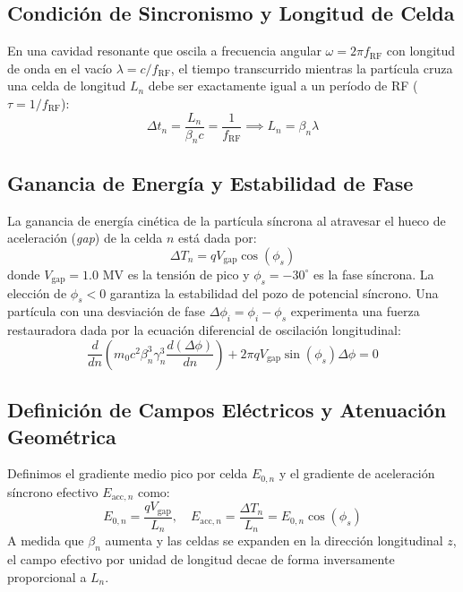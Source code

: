 \subsection{Condición de Sincronismo y Longitud de Celda}
En una cavidad resonante que oscila a frecuencia angular $\omega = 2\pi f_{\text{RF}}$ con longitud de onda en el vacío $\lambda = c / f_{\text{RF}}$, el tiempo transcurrido mientras la partícula cruza una celda de longitud $L_n$ debe ser exactamente igual a un período de RF ($\tau = 1/f_{\text{RF}}$):
\begin{equation}
\Delta t_n = \frac{L_n}{\beta_n c} = \frac{1}{f_{\text{RF}}} \implies L_n = \beta_n \lambda
\end{equation}

\subsection{Ganancia de Energía y Estabilidad de Fase}
La ganancia de energía cinética de la partícula síncrona al atravesar el hueco de aceleración (\textit{gap}) de la celda $n$ está dada por:
\begin{equation}
\Delta T_n = q V_{\text{gap}} \cos(\phi_s)
\end{equation}
donde $V_{\text{gap}} = 1.0\text{ MV}$ es la tensión de pico y $\phi_s = -30^\circ$ es la fase síncrona. La elección de $\phi_s < 0$ garantiza la estabilidad del pozo de potencial síncrono. Una partícula con una desviación de fase $\Delta\phi_i = \phi_i - \phi_s$ experimenta una fuerza restauradora dada por la ecuación diferencial de oscilación longitudinal:
\begin{equation}
\frac{d}{dn} \left( m_0 c^2 \beta_n^3 \gamma_n^3 \frac{d(\Delta\phi)}{dn} \right) + 2\pi q V_{\text{gap}} \sin(\phi_s) \Delta\phi = 0
\end{equation}

\subsection{Definición de Campos Eléctricos y Atenuación Geométrica}
Definimos el gradiente medio pico por celda $E_{0,n}$ y el gradiente de aceleración síncrono efectivo $E_{\text{acc},n}$ como:
\begin{equation}
E_{0,n} = \frac{q V_{\text{gap}}}{L_n}, \quad E_{\text{acc},n} = \frac{\Delta T_n}{L_n} = E_{0,n} \cos(\phi_s)
\end{equation}
A medida que $\beta_n$ aumenta y las celdas se expanden en la dirección longitudinal $z$, el campo efectivo por unidad de longitud decae de forma inversamente proporcional a $L_n$.
